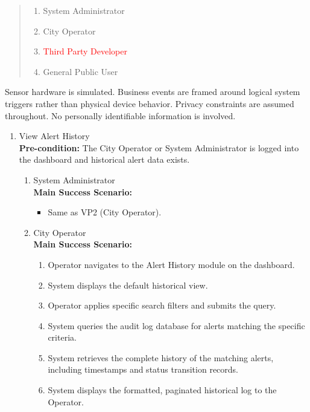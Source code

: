 {
\begin{quote}
	\begin{enumerate}[\bf VP1.]
		\item System Administrator
		\item City Operator
		\item \textcolor{red}{Third Party Developer}
		\item General Public User
	\end{enumerate}
\end{quote}

 Sensor hardware is simulated. Business events are framed around logical system triggers rather than physical device behavior. Privacy constraints are assumed throughout. No personally identifiable information is involved.\\

\begin{enumerate}[{\bf BE1.}]

	\item View Alert History \\
    {\bf Pre-condition:} The City Operator or System Administrator is logged into the dashboard and historical alert data exists.
    \begin{enumerate}[{\bf VP1.}]
        \item System Administrator \\
            {\bf Main Success Scenario:}
                \begin{itemize}
                    \item Same as VP2 (City Operator).
                \end{itemize}
        \item City Operator \\
            {\bf Main Success Scenario:}
                \begin{enumerate}[1. ]
                    \item Operator navigates to the Alert History module on the dashboard.
                    \item System displays the default historical view.
                    \item Operator applies specific search filters and submits the query.
                    \item System queries the audit log database for alerts matching the specific criteria.
                    \item System retrieves the complete history of the matching alerts, including timestamps and status transition records.
                    \item System displays the formatted, paginated historical log to the Operator.
                \end{enumerate}


\end{enumerate}
\end{enumerate}}

